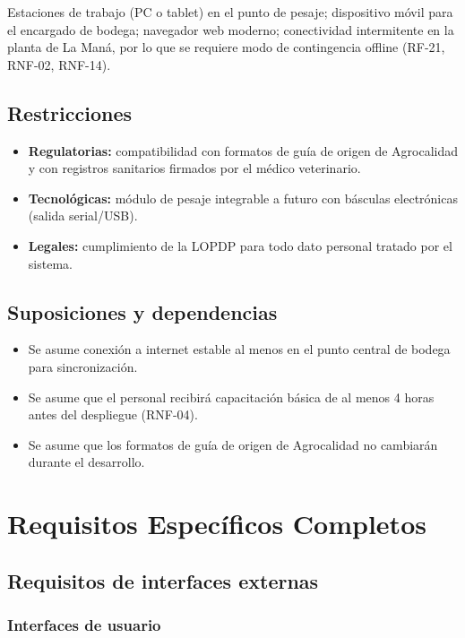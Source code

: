 \documentclass[11pt,a4paper]{article}
\begin{document}
Estaciones de trabajo (PC o tablet) en el punto de pesaje; dispositivo móvil para el encargado de bodega; navegador web moderno; conectividad intermitente en la planta de La Maná, por lo que se requiere modo de contingencia offline (RF-21, RNF-02, RNF-14).

\subsection{Restricciones}
\begin{itemize}[nosep]
\item \textbf{Regulatorias:} compatibilidad con formatos de guía de origen de Agrocalidad y con registros sanitarios firmados por el médico veterinario.
\item \textbf{Tecnológicas:} módulo de pesaje integrable a futuro con básculas electrónicas (salida serial/USB).
\item \textbf{Legales:} cumplimiento de la LOPDP \cite{lopd2021} para todo dato personal tratado por el sistema.
\end{itemize}

\subsection{Suposiciones y dependencias}
\begin{itemize}[nosep]
\item Se asume conexión a internet estable al menos en el punto central de bodega para sincronización.
\item Se asume que el personal recibirá capacitación básica de al menos 4 horas antes del despliegue (RNF-04).
\item Se asume que los formatos de guía de origen de Agrocalidad no cambiarán durante el desarrollo.
\end{itemize}

\section{Requisitos Específicos Completos}

\subsection{Requisitos de interfaces externas}

\subsubsection{Interfaces de usuario}
\end{document}
